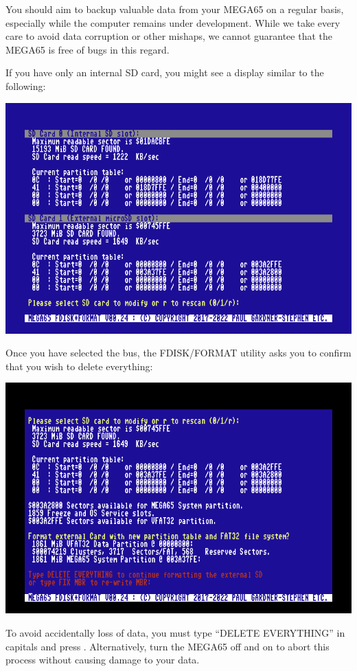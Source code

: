 You should aim to backup valuable data from your
MEGA65 on a regular basis, especially while the computer remains under
development.  While we take every care to avoid data corruption or
other mishaps, we cannot guarantee that the MEGA65 is free of bugs in
this regard.

If you have only an internal SD card, you might see a
display similar to the following:

\includegraphics[width=\linewidth]{images/ss-m65fdisk-busselect.png}

Once you have selected the bus, the FDISK/FORMAT utility asks you
to confirm that you wish to delete everything:

\includegraphics[width=\linewidth]{images/ss-m65fdisk-typesomething.png}

To avoid accidentally loss of data, you
must type ``DELETE EVERYTHING'' in capitals and press
.  Alternatively, turn the MEGA65 off and on to
abort this process without causing damage to your data.

